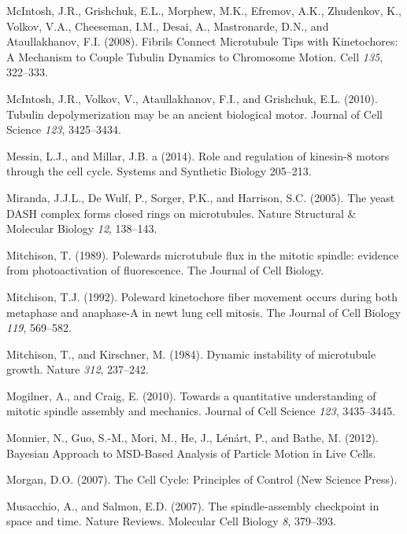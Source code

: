 \documentclass[12pt,a4paper,twoside,openright]{book}
\begin{document}
\hypertarget{ref-McIntosh2008}{}
McIntosh, J.R., Grishchuk, E.L., Morphew, M.K., Efremov, A.K.,
Zhudenkov, K., Volkov, V.A., Cheeseman, I.M., Desai, A., Mastronarde,
D.N., and Ataullakhanov, F.I. (2008). Fibrils Connect Microtubule Tips
with Kinetochores: A Mechanism to Couple Tubulin Dynamics to Chromosome
Motion. Cell \emph{135}, 322--333.

\hypertarget{ref-McIntosh2010}{}
McIntosh, J.R., Volkov, V., Ataullakhanov, F.I., and Grishchuk, E.L.
(2010). Tubulin depolymerization may be an ancient biological motor.
Journal of Cell Science \emph{123}, 3425--3434.

\hypertarget{ref-Messin2014}{}
Messin, L.J., and Millar, J.B. a (2014). Role and regulation of
kinesin-8 motors through the cell cycle. Systems and Synthetic Biology
205--213.

\hypertarget{ref-Miranda2005}{}
Miranda, J.J.L., De Wulf, P., Sorger, P.K., and Harrison, S.C. (2005).
The yeast DASH complex forms closed rings on microtubules. Nature
Structural \& Molecular Biology \emph{12}, 138--143.

\hypertarget{ref-Mitchison1989}{}
Mitchison, T. (1989). Polewards microtubule flux in the mitotic spindle:
evidence from photoactivation of fluorescence. The Journal of Cell
Biology.

\hypertarget{ref-Mitchison1992}{}
Mitchison, T.J. (1992). Poleward kinetochore fiber movement occurs
during both metaphase and anaphase-A in newt lung cell mitosis. The
Journal of Cell Biology \emph{119}, 569--582.

\hypertarget{ref-Mitchison1984}{}
Mitchison, T., and Kirschner, M. (1984). Dynamic instability of
microtubule growth. Nature \emph{312}, 237--242.

\hypertarget{ref-Mogilner2010}{}
Mogilner, A., and Craig, E. (2010). Towards a quantitative understanding
of mitotic spindle assembly and mechanics. Journal of Cell Science
\emph{123}, 3435--3445.

\hypertarget{ref-Monnier2012}{}
Monnier, N., Guo, S.-M., Mori, M., He, J., Lénárt, P., and Bathe, M.
(2012). Bayesian Approach to MSD-Based Analysis of Particle Motion in
Live Cells.

\hypertarget{ref-Morgan2007}{}
Morgan, D.O. (2007). The Cell Cycle: Principles of Control (New Science
Press).

\hypertarget{ref-Musacchio2007}{}
Musacchio, A., and Salmon, E.D. (2007). The spindle-assembly checkpoint
in space and time. Nature Reviews. Molecular Cell Biology \emph{8},
379--393.
\end{document}
